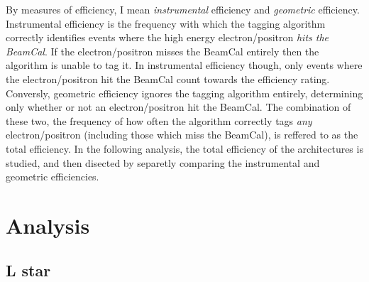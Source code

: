 \documentclass{report}
\begin{document}
            By measures of efficiency, I mean \textit{instrumental} efficiency and \textit{geometric} efficiency. Instrumental efficiency is the frequency with which the tagging algorithm correctly identifies events where the high energy electron/positron \textit{hits the BeamCal}. If the electron/positron misses the BeamCal entirely then the algorithm is unable to tag it. In instrumental efficiency though, only events where the electron/positron hit the BeamCal count towards the efficiency rating. Conversly, geometric efficiency ignores the tagging algorithm entirely, determining only whether or not an electron/positron hit the BeamCal. The combination of these two, the frequency of how often the algorithm correctly tags \textit{any} electron/positron (including those which miss the BeamCal), is reffered to as the total efficiency. In the following analysis, the total efficiency of the architectures is studied, and then disected by separetly comparing the instrumental and geometric efficiencies.





    \chapter{Analysis}
        \section{L star}
\end{document}
